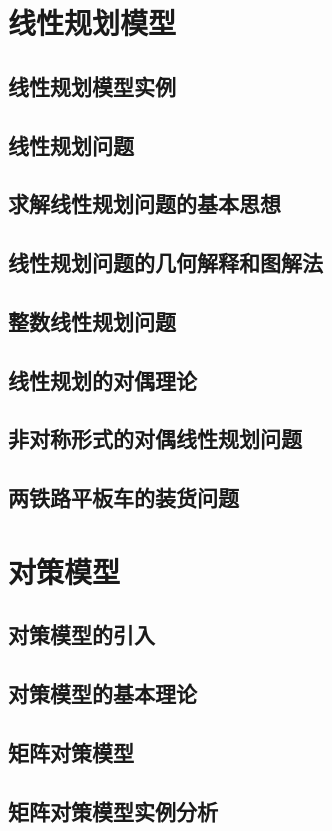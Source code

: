 \documentclass[openany]{progbookcn}
\begin{document}
\chapter{线性规划模型}
\section{线性规划模型实例}
\section{线性规划问题}
\section{求解线性规划问题的基本思想}
\section{线性规划问题的几何解释和图解法}
\section{整数线性规划问题}
\section{线性规划的对偶理论}
\section{非对称形式的对偶线性规划问题}
\section{两铁路平板车的装货问题}

\chapter{对策模型}
\section{对策模型的引入}
\section{对策模型的基本理论}
\section{矩阵对策模型}
\section{矩阵对策模型实例分析}
\end{document}

